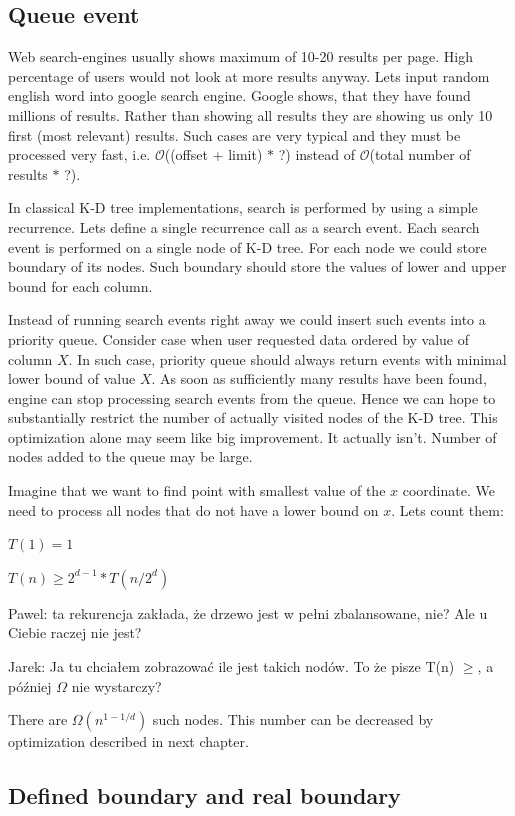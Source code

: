 \documentclass[10pt,a4paper]{article}
\newcommand{\pawel}[1]{\noindent\colorbox{myRed}{Pawel: #1}}
\newcommand{\jarek}[1]{\noindent\colorbox{myYellow}{Jarek: #1}}
\newcommand{\Oh}{\mathcal{O}}
\begin{document}
\subsection{Queue event}
Web search-engines usually shows maximum of 10-20 results per page. High percentage of users would not look at more results anyway. Lets input random english word into google search engine. Google shows, that they have found millions of results. Rather than showing all results they are showing us only 10 first (most relevant) results. Such cases are very typical and they must be processed very fast, i.e. $\Oh$((offset + limit) $*$ ?) instead of $\Oh$(total number of results $*$ ?).

In classical K-D tree implementations, search is performed by using a simple recurrence. Lets define a single recurrence call as a search event. Each search event is performed on a single node of K-D tree. For each node we could store boundary of its nodes. Such boundary should store the values of lower and upper bound for each column.

Instead of running search events right away we could insert such events into a priority queue. Consider case when user requested data ordered by value of column $X$. In such case, priority queue should always return events with minimal lower bound of value $X$. As soon as sufficiently many results have been found, engine can stop processing search events from the queue. Hence we can hope to substantially restrict the number of actually visited nodes of the K-D tree. This optimization alone may seem like big improvement. It actually isn't. Number of nodes added to the queue may be large.

Imagine that we want to find point with smallest value of the $x$ coordinate. We need to process all nodes
that do not have a lower bound on $x$. Lets count them:
\bigskip

$T(1) = 1$

$T(n) \geq 2^{d-1} * T(n/2^{d})$

\pawel{ta rekurencja zakłada, że drzewo jest w pełni zbalansowane, nie? Ale u Ciebie raczej nie jest?}

\jarek{Ja tu chciałem zobrazować ile jest takich nodów. To że pisze T(n) $\geq$, a później $\Omega$ nie wystarczy?}
\bigskip

There are $\Omega (n^{1-1/d})$ such nodes. This number can be decreased by optimization described in next chapter.

\subsection{Defined boundary and real boundary}
\end{document}
